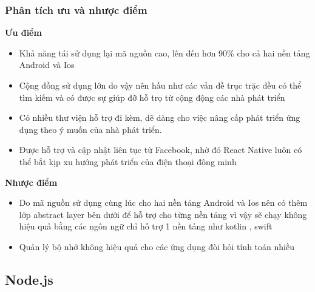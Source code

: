 \subsubsection{Phân tích ưu và nhược điểm}
\textbf{Ưu điểm}
\begin{itemize}
    \item Khả năng tái sử dụng lại mã nguồn cao, lên đến hơn 90\% cho cả hai nền tảng Android và Ios 
    \item Cộng đồng sử dụng lớn do vậy nên hầu như các vấn đề trục trặc đều có thể tìm kiếm và có được sự giúp đỡ hỗ trọ từ cộng động các nhà phát triển
    \item Có nhiều thư viện hỗ trợ đi kèm, dẽ dàng cho việc nâng cấp phát triển ứng dụng theo ý muốn của nhà phát triển.
    \item Được hỗ trợ và cập nhật liên tục từ Facebook, nhờ đó React Native luôn có thể bắt kịp xu hướng phát triển của điện thoại đông minh
\end{itemize}
\textbf{Nhược điểm}
\begin{itemize}
    \item Do mã nguồn sử dụng cùng lúc cho hai nền tảng Android và Ios nên có thêm lớp abstract layer bên dưới để hỗ trợ cho từng nền tảng vì vậy sẽ chạy không hiệu quả bằng các ngôn ngữ chỉ hỗ trợ 1 nền tảng như kotlin , swift
    \item Quản lý bộ nhớ không hiệu quả cho các ứng dụng đòi hỏi tính toán nhiều
\end{itemize}
\subsection{Node.js}

